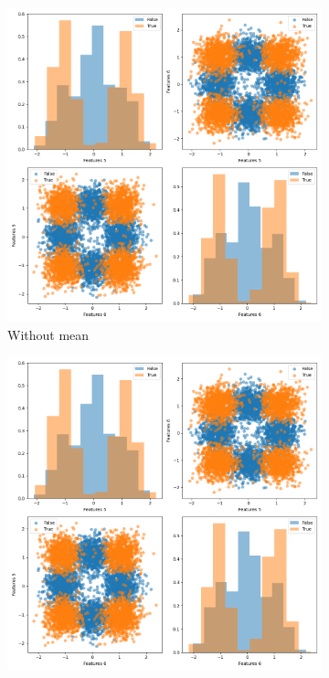 \begin{enumerate}
    \begin{figure}[t]
        \centering
        \begin{subfigure}[b]{0.4\linewidth}
            \includegraphics[width=\linewidth]{Lab/02. Lab 02/Images/05. Graphics Features 5_6 Without Mean}
            \caption{Without mean}
            \label{fig:feature5vs6a}
        \end{subfigure}
        \begin{subfigure}[b]{0.4\linewidth}
            \includegraphics[width=\linewidth]{Lab/02. Lab 02/Images/06. Graphics Features 5_6 With Mean}

\end{subfigure}
\end{figure}
\end{enumerate}
